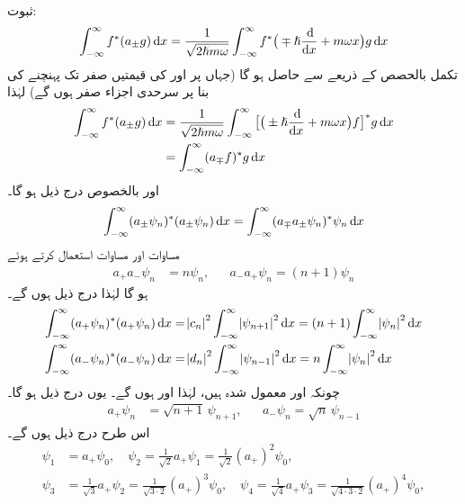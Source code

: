 ثبوت:
\begin{align*}
\int_{ - \infty}^{ \infty } f^*( a_{\pm}g ) \dif x = \frac{1}{ \sqrt{ 2 \hslash m \omega } } \int_{ - \infty }^{ \infty } f^*\big( \mp \hslash \frac{\dif}{\dif x} + m \omega x \big) g \dif x
\end{align*} 
تکمل بالحصص کے ذریعے 
 سے  حاصل ہو گا (جہاں  پر  اور  کی قیمتیں صفر تک پہنچنے کی بنا پر سرحدی اجزاء صفر ہوں گے) لہٰذا 
\begin{align*}
\int_{ - \infty }^{ \infty } f^*( a_{\pm} g) \dif x &= \frac{1}{ \sqrt{ 2 \hslash m \omega } } \int_{ - \infty }^{ \infty } \big[ \big( \pm \hslash \frac{\dif}{\dif x} + m \omega x \big) f\big]^* g \dif x \\
&= \int_{ - \infty }^{ \infty } (a_\mp f )^* g \dif x
\end{align*} 
اور بالخصوص درج ذیل ہو گا۔
\begin{align*}
\int_{ - \infty }^{ \infty } ( a_\pm \psi_n )^*( a_\pm \psi_n ) \dif x = \int_{ - \infty }^{ \infty } ( a_\mp a_\pm \psi_n )^* \psi_n \dif x
\end{align*}
 مساوات  اور مساوات  استعمال کرتے ہوئے 
\begin{align}\label{مساوات_شروڈنگر_سیڑھی_رفعت_تقلیل}
a_+ a_- \psi_n &= n \psi_n , && a_- a_+ \psi_n = ( n+1 ) \psi_n 
\end{align}
ہو گا لہٰذا درج ذیل ہوں گے۔ 
\begin{align*}
\int_{ - \infty }^{ \infty } ( a_+ \psi_n )^*( a_+ \psi_n ) \dif x &= \abs{c_n }^2 \int_{ - \infty }^{ \infty } \abs{ \psi_{n+1} }^2 \dif x = ( n+1 ) \int_{ - \infty }^{ \infty } \abs{ \psi_n }^2 \dif x
\\
\int_{ - \infty }^{ \infty } ( a_- \psi_n )^*( a_- \psi_n ) \dif x &= \abs{ d_n }^2 \int_{ - \infty }^{ \infty } \abs{ \psi_{n-1} }^2 \dif x = n \int_{ - \infty }^{ \infty } \abs{ \psi_n }^2 \dif x
\end{align*}
چونکہ  اور  معمول شدہ ہیں، لہٰذا  اور
 ہوں گے۔ یوں درج ذیل ہو گا۔
\begin{align}
a_+ \psi_n &= \sqrt{n+1} \,\psi_{n+1} ,&& a_- \psi_n = \sqrt{n} \,\psi_{n-1}
\end{align}
اس طرح درج ذیل ہوں گے۔
\begin{align*}
\psi_1 &= a_+ \psi_0 , \quad \psi_2 =\frac{1}{\sqrt{2}} a_+ \psi_1 = \frac{1}{ \sqrt{ 2 } } (a_+)^2 \psi_0,
\\
\psi_3 &= \frac{ 1 }{ \sqrt{ 3 } } a_+ \psi_2 = \frac{ 1 }{ \sqrt{3 \cdot 2} } ( a_+ )^3 \psi_0 ,\quad \psi_4 = \frac{1}{ \sqrt{4} } a_+ \psi_3 =\frac{1}{ \sqrt{4 \cdot 3 \cdot 2} } ( a_+)^4 \psi_0,
\end{align*}
